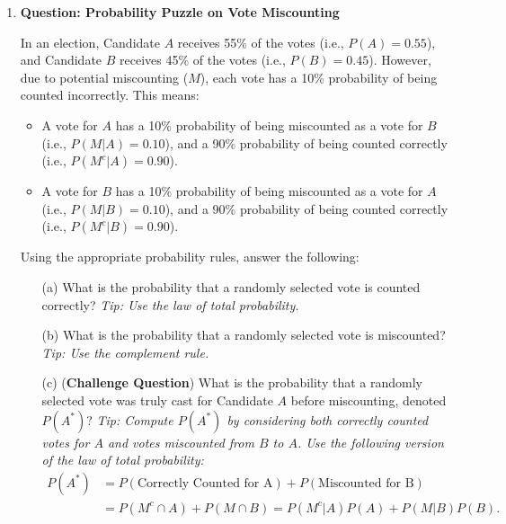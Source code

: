 \documentclass{article}
\newcommand{\blankbox}[2][3cm]{%
    \vspace{-0.5em}
    \begin{figure}[H]
        \makebox[\linewidth]{%
            \begin{tcolorbox}[
                colback=white, 
                colframe=black, 
                width=#2, %
                height=#1,
                boxrule=0.2mm
            ]
            \end{tcolorbox}
        }
    \end{figure}
    \vspace{-1em}
}
\begin{document}
\begin{enumerate}
    \item \textbf{Question: Probability Puzzle on Vote Miscounting}

    In an election, Candidate \( A \) receives 55\% of the votes (i.e., $P(A)=0.55$), and Candidate \( B \) receives 45\% of the votes (i.e., $P(B)=0.45$). However, due to potential miscounting ($M$), each vote has a 10\% probability of being counted incorrectly. This means:
    \begin{itemize}
        \item A vote for \( A \) has a 10\% probability of being miscounted as a vote for \( B \) (i.e., \( P(M | A) = 0.10 \)), and a 90\% probability of being counted correctly (i.e., \( P(M^c | A) = 0.90 \)).
        \item A vote for \( B \) has a 10\% probability of being miscounted as a vote for \( A \) (i.e., \( P(M | B) = 0.10 \)), and a 90\% probability of being counted correctly (i.e., \( P(M^c | B) = 0.90 \)).
    \end{itemize}

    Using the appropriate probability rules, answer the following:

    \begin{enumerate}
        \item[(a)] What is the probability that a randomly selected vote is counted correctly?  
        \textit{Tip: Use the law of total probability.}
        \blankbox[5cm]{1.1\textwidth}

        \item[(b)] What is the probability that a randomly selected vote is miscounted?  
        \textit{Tip: Use the complement rule.}
        \blankbox[5cm]{1.1\textwidth}

        \item[(c)] (\textbf{Challenge Question}) What is the probability that a randomly selected vote was truly cast for Candidate \( A \) before miscounting, denoted \( P(A^*) \)?  
        \textit{Tip: Compute \( P(A^*) \) by considering both correctly counted votes for \( A \) and votes miscounted from \( B \) to \( A \). Use the following version of the law of total probability:}
        \begin{align*}
         P(A^*) &= P(\text{Correctly Counted for A}) + P(\text{Miscounted for B})   \\ 
             & = P(M^c \cap A) + P(M \cap B) = P(M^c | A) P(A) + P(M | B) P(B).
        \end{align*} \vspace{-2em}
        \blankbox[5cm]{1.1\textwidth}


\end{enumerate}
\end{enumerate}
\end{document}
